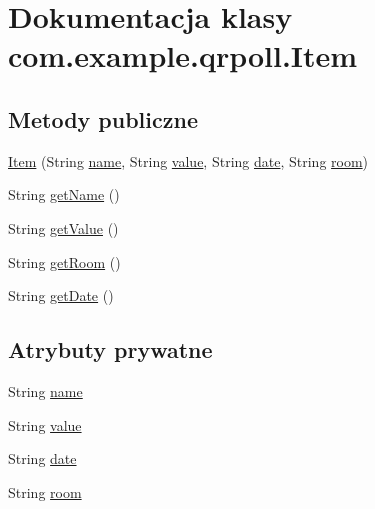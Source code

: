 \hypertarget{classcom_1_1example_1_1qrpoll_1_1_item}{\section{Dokumentacja klasy com.\+example.\+qrpoll.\+Item}
\label{classcom_1_1example_1_1qrpoll_1_1_item}
}
\subsection*{Metody publiczne}
\begin{DoxyCompactItemize}
\item 
\hyperlink{classcom_1_1example_1_1qrpoll_1_1_item_aa6d7270dec34174ec5a97a8e078a7b73}{Item} (String \hyperlink{classcom_1_1example_1_1qrpoll_1_1_item_a70600dc1190682886f0976b418f13a76}{name}, String \hyperlink{classcom_1_1example_1_1qrpoll_1_1_item_abc0a6b74f1923ca042b9b9d3b48f014c}{value}, String \hyperlink{classcom_1_1example_1_1qrpoll_1_1_item_a47b12c3c00c7a7a9deddb47f139af3cc}{date}, String \hyperlink{classcom_1_1example_1_1qrpoll_1_1_item_ad54518f2889a23bb19316b92711a655c}{room})
\item 
String \hyperlink{classcom_1_1example_1_1qrpoll_1_1_item_aeb31d724eaef2d0ceb0b9869febc6d90}{get\+Name} ()
\item 
String \hyperlink{classcom_1_1example_1_1qrpoll_1_1_item_a278aaa91e51246a75710ecbf25c4ea40}{get\+Value} ()
\item 
String \hyperlink{classcom_1_1example_1_1qrpoll_1_1_item_a184b73561804e998971d7fea88a1d7e0}{get\+Room} ()
\item 
String \hyperlink{classcom_1_1example_1_1qrpoll_1_1_item_a3019ed300c8ffeb23ec841c7fab213c7}{get\+Date} ()
\end{DoxyCompactItemize}
\subsection*{Atrybuty prywatne}
\begin{DoxyCompactItemize}
\item 
String \hyperlink{classcom_1_1example_1_1qrpoll_1_1_item_a70600dc1190682886f0976b418f13a76}{name}
\item 
String \hyperlink{classcom_1_1example_1_1qrpoll_1_1_item_abc0a6b74f1923ca042b9b9d3b48f014c}{value}
\item 
String \hyperlink{classcom_1_1example_1_1qrpoll_1_1_item_a47b12c3c00c7a7a9deddb47f139af3cc}{date}
\item 
String \hyperlink{classcom_1_1example_1_1qrpoll_1_1_item_ad54518f2889a23bb19316b92711a655c}{room}
\end{DoxyCompactItemize}


